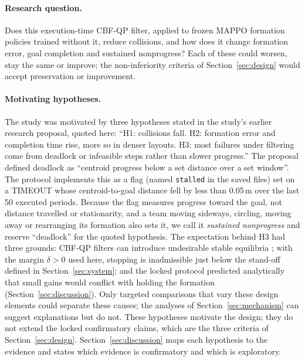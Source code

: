 \documentclass[11pt]{article}
\begin{document}
\paragraph{Research question.} Does this execution-time CBF-QP filter, applied to frozen MAPPO
formation policies trained without it, reduce collisions, and how does it change formation error,
goal completion and sustained nonprogress? Each of these could worsen, stay the same or improve; the
non-inferiority criteria of Section~\ref{sec:design} would accept preservation or improvement.

\paragraph{Motivating hypotheses.} The study was motivated by three hypotheses stated
in the study's earlier research proposal, quoted here: ``H1: collisions fall. H2: formation error and
completion time rise, more so in denser layouts. H3: most failures under filtering come from
deadlock or infeasible steps rather than slower progress.'' The proposal defined deadlock as ``centroid
progress below a set distance over a set window''. The protocol implements this as a flag (named
\texttt{stalled} in the saved files) set on a TIMEOUT whose centroid-to-goal distance fell by less than
0.05\,m over the last 50 executed periods. Because the flag measures progress toward the goal, not
distance travelled or stationarity, and a team moving sideways, circling, moving away or rearranging its
formation also sets it, we call it \emph{sustained nonprogress} and reserve ``deadlock'' for the quoted
hypothesis. The expectation behind H3 had three grounds: CBF-QP filters can introduce undesirable
stable equilibria \cite{reis2021,grover2023}; with the margin $\delta>0$ used here, stopping is
inadmissible just below the stand-off defined in Section~\ref{sec:system}; and the locked protocol
predicted analytically that small gains would conflict with holding the formation
(Section~\ref{sec:discussion}). Only targeted comparisons that vary these design elements could separate
these causes; the analyses of Section~\ref{sec:mechanism} can suggest explanations but do not. These hypotheses
motivate the design; they do not extend the locked confirmatory claims, which are the three
criteria of Section~\ref{sec:design}. Section~\ref{sec:discussion} maps each hypothesis to the
evidence and states which evidence is confirmatory and which is exploratory.
\end{document}
